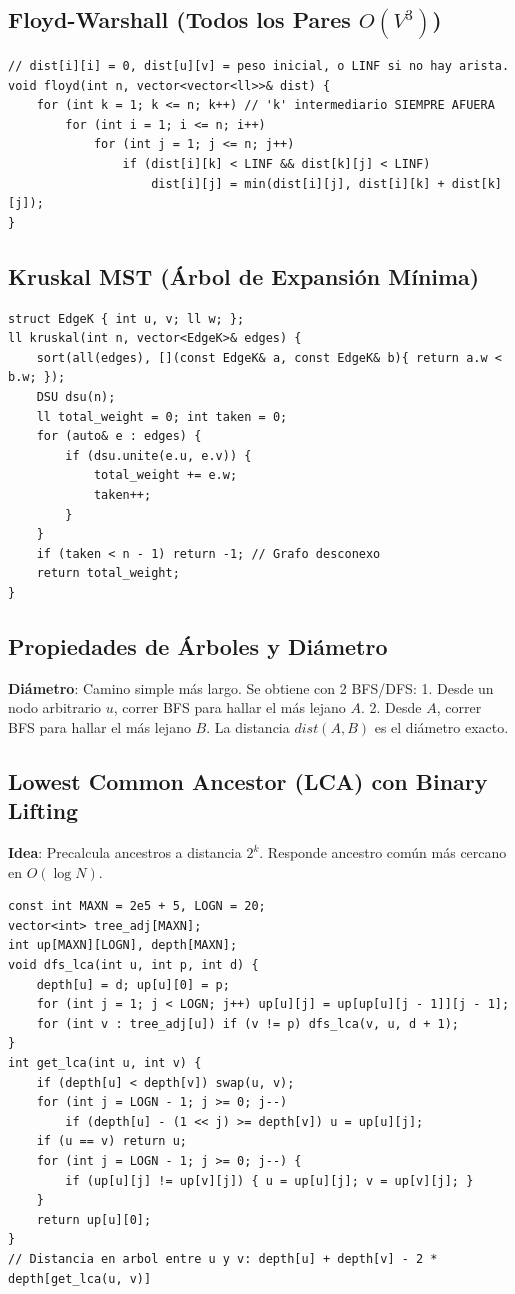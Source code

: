 \documentclass[9pt,twocolumn,a4paper]{extarticle}
\begin{document}
\subsection{Floyd-Warshall (Todos los Pares $O(V^3)$)}
\begin{lstlisting}
// dist[i][i] = 0, dist[u][v] = peso inicial, o LINF si no hay arista.
void floyd(int n, vector<vector<ll>>& dist) {
    for (int k = 1; k <= n; k++) // 'k' intermediario SIEMPRE AFUERA
        for (int i = 1; i <= n; i++)
            for (int j = 1; j <= n; j++)
                if (dist[i][k] < LINF && dist[k][j] < LINF)
                    dist[i][j] = min(dist[i][j], dist[i][k] + dist[k][j]);
}
\end{lstlisting}

\subsection{Kruskal MST (Árbol de Expansión Mínima)}
\begin{lstlisting}
struct EdgeK { int u, v; ll w; };
ll kruskal(int n, vector<EdgeK>& edges) {
    sort(all(edges), [](const EdgeK& a, const EdgeK& b){ return a.w < b.w; });
    DSU dsu(n);
    ll total_weight = 0; int taken = 0;
    for (auto& e : edges) {
        if (dsu.unite(e.u, e.v)) {
            total_weight += e.w;
            taken++;
        }
    }
    if (taken < n - 1) return -1; // Grafo desconexo
    return total_weight;
}
\end{lstlisting}

\subsection{Propiedades de Árboles y Diámetro}
\textbf{Diámetro}: Camino simple más largo. Se obtiene con 2 BFS/DFS:
1. Desde un nodo arbitrario $u$, correr BFS para hallar el más lejano $A$.
2. Desde $A$, correr BFS para hallar el más lejano $B$. La distancia $dist(A, B)$ es el diámetro exacto.

\subsection{Lowest Common Ancestor (LCA) con Binary Lifting}
\textbf{Idea}: Precalcula ancestros a distancia $2^k$. Responde ancestro común más cercano en $O(\log N)$.
\begin{lstlisting}
const int MAXN = 2e5 + 5, LOGN = 20;
vector<int> tree_adj[MAXN];
int up[MAXN][LOGN], depth[MAXN];
void dfs_lca(int u, int p, int d) {
    depth[u] = d; up[u][0] = p;
    for (int j = 1; j < LOGN; j++) up[u][j] = up[up[u][j - 1]][j - 1];
    for (int v : tree_adj[u]) if (v != p) dfs_lca(v, u, d + 1);
}
int get_lca(int u, int v) {
    if (depth[u] < depth[v]) swap(u, v);
    for (int j = LOGN - 1; j >= 0; j--)
        if (depth[u] - (1 << j) >= depth[v]) u = up[u][j];
    if (u == v) return u;
    for (int j = LOGN - 1; j >= 0; j--) {
        if (up[u][j] != up[v][j]) { u = up[u][j]; v = up[v][j]; }
    }
    return up[u][0];
}
// Distancia en arbol entre u y v: depth[u] + depth[v] - 2 * depth[get_lca(u, v)]
\end{lstlisting}
\end{document}
